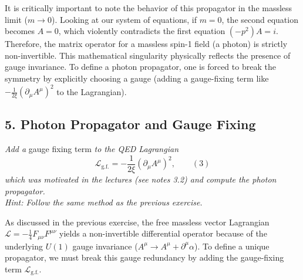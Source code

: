 \begin{remark}
    It is critically important to note the behavior of this propagator in the massless limit ($m \to 0$). Looking at our system of equations, if $m=0$, the second equation becomes $A = 0$, which violently contradicts the first equation $(-p^2)A = i$. Therefore, the matrix operator for a massless spin-1 field (a photon) is strictly non-invertible. This mathematical singularity physically reflects the presence of gauge invariance. To define a photon propagator, one is forced to break the symmetry by explicitly choosing a gauge (adding a gauge-fixing term like $-\frac{1}{2\xi}(\partial_\mu A^\mu)^2$ to the Lagrangian).
\end{remark}


\subsection*{5. Photon Propagator and Gauge Fixing}

\begin{center}
    \textit{Add a } gauge fixing term \textit{ to the QED Lagrangian}
    \[
        \mathcal{L}_{\text{g.f.}} = -\frac{1}{2\xi} (\partial_\mu A^\mu)^2, \qquad (3)
    \]
    \textit{which was motivated in the lectures (see notes 3.2) and compute the photon propagator. \\
        Hint: Follow the same method as the previous exercise.}
\end{center}

As discussed in the previous exercise, the free massless vector Lagrangian $\mathcal{L} = -\frac{1}{4}F_{\mu\nu}F^{\mu\nu}$ yields a non-invertible differential operator because of the underlying $U(1)$ gauge invariance ($A^\mu \to A^\mu + \partial^\mu \alpha$). To define a unique propagator, we must break this gauge redundancy by adding the gauge-fixing term $\mathcal{L}_{\text{g.f.}}$.

